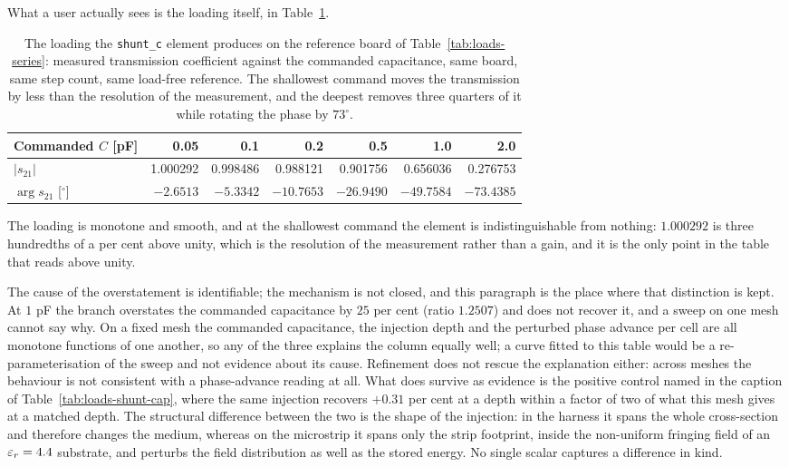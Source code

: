 What a user actually sees is the loading itself, in Table~\ref{tab:loads-shunt-load}.

\begin{table}[H]
  \centering
  \caption{The loading the \texttt{shunt\_c} element produces on the reference board of
  Table~\ref{tab:loads-series}: measured transmission coefficient against the commanded capacitance, same board,
  same step count, same load-free reference. The shallowest command moves the transmission by less than the
  resolution of the measurement, and the deepest removes three quarters of it while rotating the phase by
  $73^\circ$.}
  \label{tab:loads-shunt-load}
  \begin{tabular}{@{}lrrrrrr@{}}
    \toprule
    Commanded $C$ [pF] & 0.05 & 0.1 & 0.2 & 0.5 & 1.0 & 2.0 \\
    \midrule
    $|s_{21}|$             & 1.000292 & 0.998486 & 0.988121 & 0.901756 & 0.656036 & 0.276753 \\
    $\arg s_{21}$ [$^\circ$] & $-2.6513$ & $-5.3342$ & $-10.7653$ & $-26.9490$ & $-49.7584$ & $-73.4385$ \\
    \bottomrule
  \end{tabular}
\end{table}

The loading is monotone and smooth, and at the shallowest command the element is indistinguishable from nothing:
$1.000292$ is three hundredths of a per cent above unity, which is the resolution of the measurement rather
than a gain, and it is the only point in the table that reads above unity.

The cause of the overstatement is identifiable; the mechanism is not closed, and this paragraph is the place
where that distinction is kept. At $1$ pF the branch overstates the commanded capacitance by $25$ per cent
(ratio $1.2507$) and does not recover it, and a sweep on one mesh cannot say why. On a fixed mesh the commanded
capacitance, the injection depth and the perturbed phase advance per cell are all monotone functions of one
another, so any of the three explains the column equally well; a curve fitted to this table would be a
re-parameterisation of the sweep and not evidence about its cause. Refinement does not rescue the explanation
either: across meshes the behaviour is not consistent with a phase-advance reading at all. What does survive as
evidence is the positive control named in the caption of Table~\ref{tab:loads-shunt-cap}, where the same
injection recovers $+0.31$ per cent at a depth within a factor of two of what this mesh gives at a matched
depth. The structural difference between the two is the shape of the injection: in the harness it spans the whole
cross-section and therefore changes the medium, whereas on the microstrip it spans only the strip footprint,
inside the non-uniform fringing field of an $\varepsilon_r = 4.4$ substrate, and perturbs the field distribution as well
as the stored energy. No single scalar captures a difference in kind.

